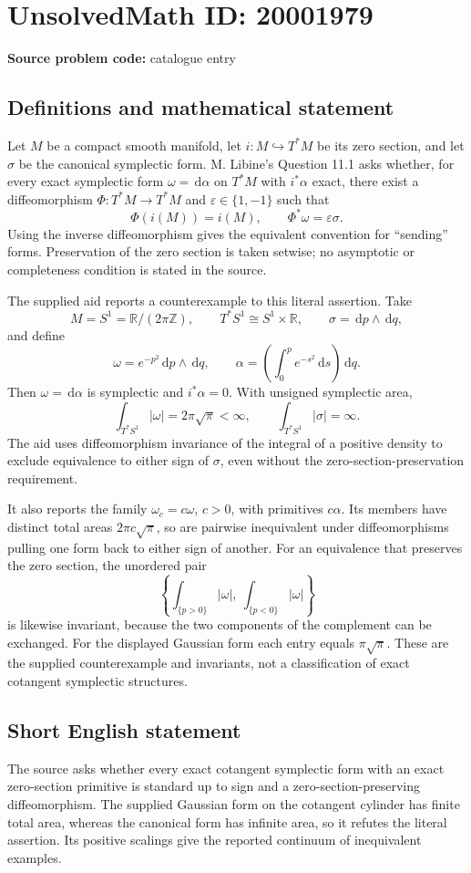 \documentclass[11pt]{article}
\newcommand{\Z}{\mathbb{Z}}
\newcommand{\R}{\mathbb{R}}
\newcommand{\dd}{\,\mathrm{d}}
\begin{document}
\section*{UnsolvedMath ID: 20001979}
\textbf{Source problem code:} catalogue entry
\subsection{Definitions and mathematical statement}
Let \(M\) be a compact smooth manifold, let \(i:M\hookrightarrow T^*M\) be its zero section, and let \(\sigma\) be the canonical symplectic form. M. Libine's Question 11.1 asks whether, for every exact symplectic form \(\omega=\dd\alpha\) on \(T^*M\) with \(i^*\alpha\) exact, there exist a diffeomorphism \(\Phi:T^*M\to T^*M\) and \(\varepsilon\in\{1,-1\}\) such that
\[
 \Phi(i(M))=i(M),\qquad \Phi^*\omega=\varepsilon\sigma.
\]
Using the inverse diffeomorphism gives the equivalent convention for ``sending'' forms. Preservation of the zero section is taken setwise; no asymptotic or completeness condition is stated in the source.

The supplied aid reports a counterexample to this literal assertion. Take
\[
 M=S^1=\R/(2\pi\Z),\qquad T^*S^1\cong S^1\times\R,
 \qquad \sigma=\dd p\wedge\dd q,
\]
and define
\[
 \omega=e^{-p^2}\dd p\wedge\dd q,
 \qquad
 \alpha=\left(\int_0^p e^{-s^2}\dd s\right)\dd q.
\]
Then \(\omega=\dd\alpha\) is symplectic and \(i^*\alpha=0\). With unsigned symplectic area,
\[
 \int_{T^*S^1}|\omega|=2\pi\sqrt\pi<\infty,
 \qquad \int_{T^*S^1}|\sigma|=\infty.
\]
The aid uses diffeomorphism invariance of the integral of a positive density to exclude equivalence to either sign of \(\sigma\), even without the zero-section-preservation requirement.

It also reports the family \(\omega_c=c\omega\), \(c>0\), with primitives \(c\alpha\). Its members have distinct total areas \(2\pi c\sqrt\pi\), so are pairwise inequivalent under diffeomorphisms pulling one form back to either sign of another. For an equivalence that preserves the zero section, the unordered pair
\[
 \left\{\int_{\{p>0\}}|\omega|,\ \int_{\{p<0\}}|\omega|\right\}
\]
is likewise invariant, because the two components of the complement can be exchanged. For the displayed Gaussian form each entry equals \(\pi\sqrt\pi\). These are the supplied counterexample and invariants, not a classification of exact cotangent symplectic structures.
\subsection{Short English statement}
The source asks whether every exact cotangent symplectic form with an exact zero-section primitive is standard up to sign and a zero-section-preserving diffeomorphism. The supplied Gaussian form on the cotangent cylinder has finite total area, whereas the canonical form has infinite area, so it refutes the literal assertion. Its positive scalings give the reported continuum of inequivalent examples.
\end{document}
